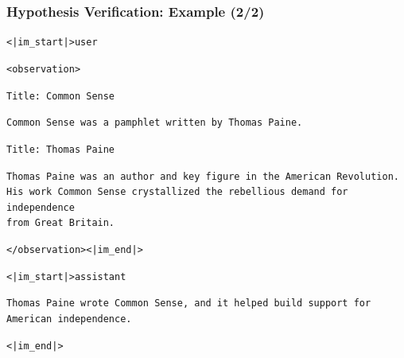 \begin{frame}[t]
    \frametitle{Hypothesis Verification: Example (2/2)}

    \scriptsize

    \texttt{<|im\_start|>user}

    \texttt{<observation>}

    \texttt{Title: Common Sense}

    \texttt{Common Sense was a pamphlet written by Thomas Paine.}

    \vspace{0.05cm}

    \texttt{Title: Thomas Paine}

    \texttt{Thomas Paine was an author and key figure in the American Revolution.}\\
    \texttt{His work Common Sense crystallized the rebellious demand for independence}\\
    \texttt{from Great Britain.}

    \texttt{</observation><|im\_end|>}

    \vspace{0.1cm}

    \texttt{<|im\_start|>assistant}

    \vspace{0.1cm}

    \texttt{Thomas Paine wrote Common Sense, and it helped build support for American independence.}

    \texttt{<|im\_end|>}

\end{frame}